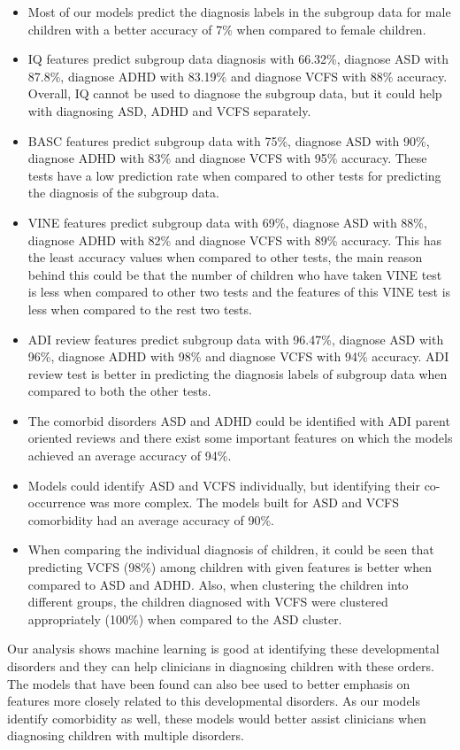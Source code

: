 \begin{itemize}
\item Most of our models predict the diagnosis labels in the subgroup data for male children with a better accuracy of 7\% when compared to female children. 
\item IQ features predict subgroup data diagnosis with 66.32\%, diagnose ASD with 87.8\%, diagnose ADHD with 83.19\% and diagnose VCFS with 88\% accuracy. Overall, IQ cannot be used to diagnose the subgroup data, but it could help with diagnosing ASD, ADHD and VCFS separately. 
\item BASC features predict subgroup data with 75\%, diagnose ASD with 90\%, diagnose ADHD with 83\% and diagnose VCFS with 95\% accuracy. These tests have a low prediction rate when compared to other tests for predicting the diagnosis of the subgroup data. 
\item VINE features predict subgroup data with 69\%, diagnose ASD with 88\%, diagnose ADHD with 82\% and diagnose VCFS with 89\% accuracy. This has the least accuracy values when compared to other tests, the main reason behind this could be that the number of children who have taken VINE test is less when compared to other two tests and the features of this VINE test is less when compared to the rest two tests. 
\item ADI review features predict subgroup data with 96.47\%, diagnose ASD with 96\%, diagnose ADHD with 98\% and diagnose VCFS with 94\% accuracy. ADI review test is better in predicting the diagnosis labels of subgroup data when compared to both the other tests. 
\item The comorbid disorders ASD and ADHD could be identified with ADI parent oriented reviews and there exist some important features on which the models achieved an average accuracy of  94\%.
\item Models could identify ASD and VCFS individually, but identifying their co-occurrence was more complex. The models built for ASD and VCFS comorbidity had an average accuracy of 90\%.
\item When comparing the individual diagnosis of children, it could be seen that predicting VCFS (98\%) among children with given features is better when compared to ASD and ADHD. Also, when clustering the children into different groups, the children diagnosed with VCFS were clustered appropriately (100\%) when compared to the ASD cluster. 
\end{itemize}

Our analysis shows machine learning is good at identifying these developmental disorders and they can help clinicians in diagnosing children with these orders. The models that have been found can also bee used to better emphasis on features more closely related to this developmental disorders. As our models identify comorbidity as well, these models would better assist clinicians when diagnosing children with multiple disorders.

